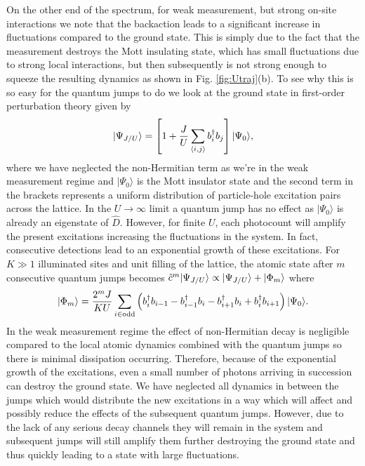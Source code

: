 On the other end of the spectrum, for weak measurement, but strong
on-site interactions we note that the backaction leads to a
significant increase in fluctuations compared to the ground
state. This is simply due to the fact that the measurement destroys
the Mott insulating state, which has small fluctuations due to strong
local interactions, but then subsequently is not strong enough to
squeeze the resulting dynamics as shown in Fig. \ref{fig:Utraj}(b). To
see why this is so easy for the quantum jumps to do we look at the
ground state in first-order perturbation theory given by
\begin{equation}
  | \Psi_{J/U} \rangle = \left[ 1 + \frac{J}{U} \sum_{\langle i, j
      \rangle} b^\dagger_i b_j \right] | \Psi_0 \rangle,
\end{equation}
where we have neglected the non-Hermitian term as we're in the weak
measurement regime and $| \Psi_0 \rangle$ is the Mott insulator state and the second
term in the brackets represents a uniform distribution of
particle-hole excitation pairs across the lattice. In the
$U \rightarrow \infty$ limit a quantum jump has no effect as
$| \Psi_0 \rangle$ is already an eigenstate of $\hat{D}$. However, for
finite $U$, each photocount will amplify the present excitations
increasing the fluctuations in the system. In fact, consecutive
detections lead to an exponential growth of these excitations. For
$K \gg 1$ illuminated sites and unit filling of the lattice, the
atomic state after $m$ consecutive quantum jumps becomes
$\hat{c}^m | \Psi_{J/U} \rangle \propto | \Psi_{J/U} \rangle + | \Phi_m
\rangle$ where
\begin{equation}
  | \Phi_m \rangle = \frac{2^m J} {K U} \sum_{i \in
    \mathrm{odd}} \left( b^\dagger_i b_{i-1} - b^\dagger_{i-1} b_i - b^\dagger_{i+1} b_i
    + b^\dagger_i b_{i+1} \right) | \Psi_0 \rangle.
\end{equation}
In the weak measurement regime the effect of non-Hermitian decay is
negligible compared to the local atomic dynamics combined with the
quantum jumps so there is minimal dissipation occurring. Therefore,
because of the exponential growth of the excitations, even a small
number of photons arriving in succession can destroy the ground
state. We have neglected all dynamics in between the jumps which would
distribute the new excitations in a way which will affect and possibly
reduce the effects of the subsequent quantum jumps. However, due to
the lack of any serious decay channels they will remain in the system
and subsequent jumps will still amplify them further destroying the
ground state and thus quickly leading to a state with large
fluctuations.

